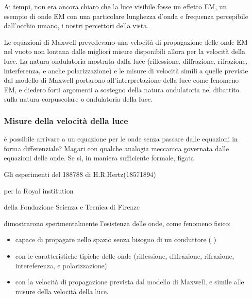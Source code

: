 \documentclass[letterpaper,10pt,italian]{jupyterBook}
\begin{document}
\sphinxAtStartPar
Ai tempi, non era ancora chiaro che la luce visibile fosse un effetto EM, un esempio di onde EM con una particolare lunghezza d’onda e frequenza percepibile dall’occhio umano, i nostri percettori della vista.

\sphinxAtStartPar
Le equazioni di Maxwell prevedevano una velocità di propagazione delle onde EM nel vuoto non lontana dalle migliori misure disponibili allora per la velocità della luce. La natura ondulatoria mostrata dalla luce (riflessione, diffrazione, rifrazione, interferenza, e anche polarizzazione) e le misure di velocità simili a quelle previste dal modello di Maxwell portarono all’interpretazione della luce come fenomeno EM, e diedero forti argomenti a sostegno della natura ondulatoria nel dibattito sulla natura corpuscolare o ondulatoria della luce.
\subsubsection*{Misure della velocità della luce}

\sphinxAtStartPar
{}

\sphinxAtStartPar
{} è possibile arrivare a un equazione per le onde senza passare dalle equazioni in forma differenziale? Magari con qualche analogia meccanica governata dalle equazioni delle onde. Se sì, in maniera sufficiente formale, figata

\sphinxAtStartPar
{} Gli esperimenti del 1887\sphinxhyphen{}88 di H.R.Hertz(1857\sphinxhyphen{}1894)%
\begin{footnote}[1]\sphinxAtStartFootnote
{} per la Royal institution
%
\end{footnote}%
\begin{footnote}[2]\sphinxAtStartFootnote
{} della Fondazione Scienza e Tecnica di Firenze
%
\end{footnote} dimostrarono sperimentalmente l’esistenza delle onde, come fenomeno fisico:
\begin{itemize}
\item {} 
\sphinxAtStartPar
capace di propagare nello spazio senza bisogno di un conduttore ( )

\item {} 
\sphinxAtStartPar
con le caratteristiche tipiche delle onde (riflessione, diffrazione, rifrazione, intereferenza, e polarizzazione)

\item {} 
\sphinxAtStartPar
con la velocità di propagazione prevista dal modello di Maxwell, e simile alle misure della velocità della luce.

\end{itemize}
\end{document}
